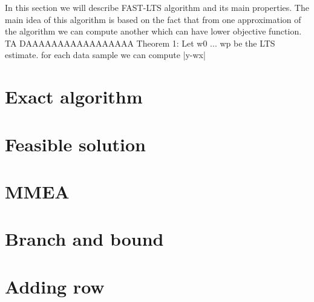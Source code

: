 


	
   
In this section we will describe FAST-LTS algorithm and its main properties. The main idea of this algorithm is based on the fact that from one approximation of the algorithm we can compute another which can have lower objective function.
 TA DAAAAAAAAAAAAAAAAA
Theorem 1: \cite{rybicka}
Let w0 ... wp be the LTS estimate.
for each data sample we can compute |y-wx|




\section{Exact algorithm}
\section{Feasible solution}
\section{MMEA}
\section{Branch and bound}
\section{Adding row}
